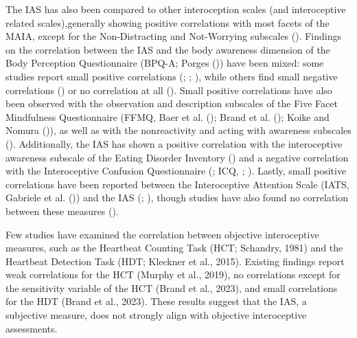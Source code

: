 \documentclass[
  man,
  floatsintext,
  longtable,
  nolmodern,
  notxfonts,
  notimes,
  colorlinks=true,linkcolor=blue,citecolor=blue,urlcolor=blue]{apa7}
\begin{document}
The IAS has also been compared to other interoception scales (and
interoceptive related scales),generally showing positive correlations
with most facets of the MAIA, except for the Non-Distracting and
Not-Worrying subscales ().
Findings on the correlation between the IAS and the body awareness
dimension of the Body Perception Questionnaire (BPQ-A; Porges
()) have been mixed: some studies
report small positive correlations (; ;
), while others find
small negative correlations ()
or no correlation at all (). Small positive correlations have also been observed with the
observation and description subscales of the Five Facet Mindfulness
Questionnaire (FFMQ, Baer et al. ();
Brand et al. (); Koike and Nomura
()), as well as with the nonreactivity and
acting with awareness subscales (). Additionally, the IAS has shown a positive correlation
with the interoceptive awareness subscale of the Eating Disorder
Inventory () and a negative
correlation with the Interoceptive Confusion Questionnaire
(; ICQ,
;
). Lastly, small positive
correlations have been reported between the Interoceptive Attention
Scale (IATS, Gabriele et al.
()) and the IAS
(;
), though studies have also
found no correlation between these measures
().

Few studies have examined the correlation between objective
interoceptive measures, such as the Heartbeat Counting Task (HCT;
Schandry, 1981) and the Heartbeat Detection Task (HDT; Kleckner et al.,
2015). Existing findings report weak correlations for the HCT (Murphy et
al., 2019), no correlations except for the sensitivity variable of the
HCT (Brand et al., 2023), and small correlations for the HDT (Brand et
al., 2023). These results suggest that the IAS, a subjective measure,
does not strongly align with objective interoceptive assessments.
\end{document}
